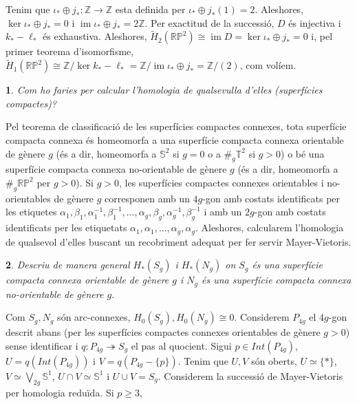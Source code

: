 \documentclass[compress,10pt]{article}
\newtheorem{enunciat}{}
\theoremstyle{definition}
\DeclareMathOperator{\im}{im}
\begin{document}
Tenim que $\iota_{*}\oplus j_{*}:\mathbb{Z}\rightarrow\mathbb{Z}$ esta definida per $\iota_{*}\oplus j_{*}(1)=2$. Aleshores, $\ker{\iota_{*}\oplus j_{*}}=0$ i $\im{\iota_{*}\oplus j_{*}}=2\mathbb{Z}$. Per exactitud de la successió, $D$ és injectiva i $k_{*}-\ell_{*}$ és exhaustiva. Aleshores, $\widetilde{H}_{2}(\mathbb{RP}^{2})\cong\im{D}=\ker{\iota_{*}\oplus j_{*}}=0$ i, pel primer teorema d'isomorfisme, $\widetilde{H}_{1}(\mathbb{RP}^{2})\cong\mathbb{Z}/\ker{k_{*}-\ell_{*}}=\mathbb{Z}/\im{\iota_{*}\oplus j_{*}}=\mathbb{Z}/(2)$, com volíem.
\begin{enunciat}
    Com ho faries per calcular l'homologia de qualsevulla d'elles (superfícies compactes)?
\end{enunciat}
Pel teorema de classificació de les superfícies compactes connexes, tota superfície compacta connexa és homeomorfa a una superfície compacta connexa orientable de gènere $g$ (és a dir, homeomorfa a $\mathbb{S}^{2}$ si $g=0$ o a $\#_{g}\mathbb{T}^{2}$ si $g>0$) o bé una superfície compacta connexa no-orientable de gènere $g$ (és a dir, homeomorfa a $\#_{g}\mathbb{RP}^{2}$ per $g>0$). Si $g>0$, les superfícies compactes connexes orientables i no-orientables de gènere $g$ corresponen amb un $4g$-gon amb costats identificats per les etiquetes $\alpha_{1},\beta_{1},\alpha_{1}^{-1},\beta_{1}^{-1},\ldots,\alpha_{g},\beta_{g},\alpha_{g}^{-1},\beta_{g}^{-1}$ i amb un $2g$-gon amb costats identificats per les etiquetats $\alpha_{1},\alpha_{1},\ldots,\alpha_{g},\alpha_{g}$. Aleshores, calcularem l'homologia de qualsevol d'elles buscant un recobriment adequat per fer servir Mayer-Vietoris.
\begin{enunciat}
    Descriu de manera general $H_{*}(S_{g})$ i $H_{*}(N_{g})$ on $S_{g}$ és una superfície compacta connexa orientable de gènere $g$ i $N_{g}$ és una superfície compacta connexa no-orientable de gènere $g$. 
\end{enunciat}
Com $S_{g},N_{g}$ són arc-connexes, $H_{0}(S_{g}),H_{0}(N_{g})\cong0$.\newline
Considerem $P_{4g}$ el $4g$-gon descrit abans (per les superfícies compactes connexes orientables de gènere $g>0$) sense identificar i $q:P_{4g}\twoheadrightarrow S_{g}$ el pas al quocient. Sigui $p\in Int(P_{4g})$, $U=q(Int(P_{4g}))$ i $V=q(P_{4g}-\{p\})$. Tenim que $U,V$ són oberts, $U\simeq\{*\}$, $V\simeq\bigvee_{2g}\mathbb{S}^{1}$, $U\cap V\simeq\mathbb{S}^{1}$ i $U\cup V=S_{g}$. Considerem la successió de Mayer-Vietoris per homologia reduïda. Si $p\geq3$,
\end{document}
